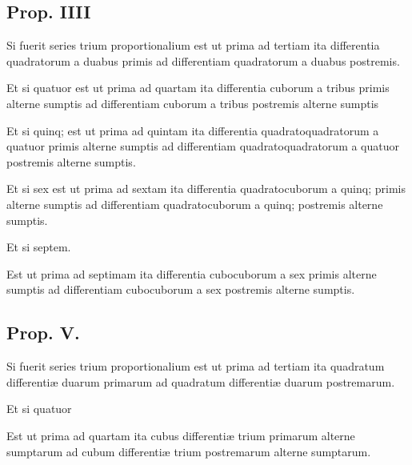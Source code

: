 \documentclass[11pt,a4paper]{article}
\begin{document}
\subsection*{Prop. IIII}

Si fuerit series trium proportionalium est ut prima ad tertiam ita differentia quadratorum a duabus primis ad differentiam quadratorum a duabus postremis.


Et si quatuor est ut prima ad quartam ita differentia cuborum a tribus primis alterne sumptis ad differentiam cuborum a tribus postremis alterne sumptis

Et si quinq; est ut prima ad quintam ita differentia quadratoquadratorum a quatuor primis alterne sumptis ad differentiam quadratoquadratorum a quatuor postremis alterne sumptis.

Et si sex est ut prima ad sextam ita differentia quadratocuborum a quinq; primis alterne sumptis ad differentiam quadratocuborum a quinq; postremis alterne sumptis.

Et si septem.

Est ut prima ad septimam ita differentia cubocuborum a sex primis alterne sumptis ad differentiam cubocuborum a sex postremis alterne sumptis.

\subsection*{Prop. V.}

Si fuerit series trium proportionalium est ut prima ad tertiam ita quadratum differentiæ duarum primarum ad quadratum differentiæ duarum postremarum.

Et si quatuor

Est ut prima ad quartam ita cubus differentiæ trium primarum alterne sumptarum ad cubum differentiæ trium postremarum alterne sumptarum.
\end{document}
